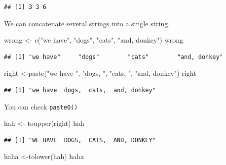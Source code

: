 \documentclass[
]{book}
\newenvironment{Shaded}{\begin{snugshade}}{\end{snugshade}}
\newcommand{\FunctionTok}[1]{\textcolor[rgb]{0.00,0.00,0.00}{#1}}
\newcommand{\NormalTok}[1]{#1}
\newcommand{\OtherTok}[1]{\textcolor[rgb]{0.56,0.35,0.01}{#1}}
\newcommand{\StringTok}[1]{\textcolor[rgb]{0.31,0.60,0.02}{#1}}
\theoremstyle{definition}
\theoremstyle{definition}
\theoremstyle{definition}
\theoremstyle{definition}
\theoremstyle{remark}
\begin{document}
\begin{verbatim}
## [1] 3 3 6
\end{verbatim}

We can concatenate several strings into a single string.

\begin{Shaded}
\begin{Highlighting}[]
\NormalTok{wrong }\OtherTok{\textless{}{-}} \FunctionTok{c}\NormalTok{(}\StringTok{"we have"}\NormalTok{, }\StringTok{"dogs"}\NormalTok{, }\StringTok{"cats"}\NormalTok{, }\StringTok{"and, donkey"}\NormalTok{)}
\NormalTok{wrong}
\end{Highlighting}
\end{Shaded}

\begin{verbatim}
## [1] "we have"     "dogs"        "cats"        "and, donkey"
\end{verbatim}

\begin{Shaded}
\begin{Highlighting}[]
\NormalTok{right }\OtherTok{\textless{}{-}}\FunctionTok{paste}\NormalTok{(}\StringTok{"we have "}\NormalTok{, }\StringTok{"dogs, "}\NormalTok{, }\StringTok{"cats, "}\NormalTok{, }\StringTok{"and, donkey"}\NormalTok{)}
\NormalTok{right}
\end{Highlighting}
\end{Shaded}

\begin{verbatim}
## [1] "we have  dogs,  cats,  and, donkey"
\end{verbatim}

You can check \texttt{paste0()}

\begin{Shaded}
\begin{Highlighting}[]
\NormalTok{hah }\OtherTok{\textless{}{-}} \FunctionTok{toupper}\NormalTok{(right)}
\NormalTok{hah}
\end{Highlighting}
\end{Shaded}

\begin{verbatim}
## [1] "WE HAVE  DOGS,  CATS,  AND, DONKEY"
\end{verbatim}

\begin{Shaded}
\begin{Highlighting}[]
\NormalTok{haha }\OtherTok{\textless{}{-}}\FunctionTok{tolower}\NormalTok{(hah) }
\NormalTok{haha}
\end{Highlighting}
\end{Shaded}
\end{document}
